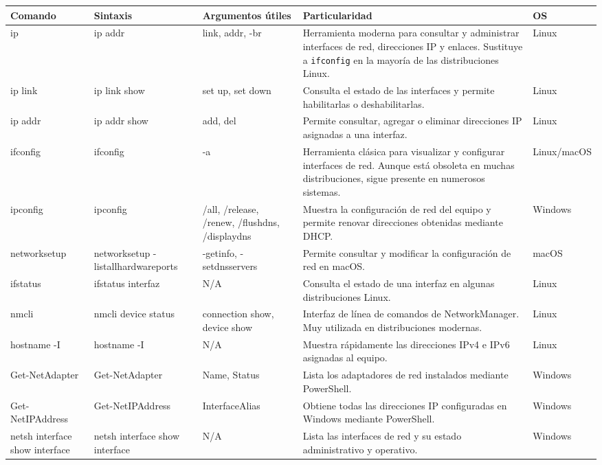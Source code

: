 \documentclass[a4paper,10pt]{article}
\begin{document}
\begin{longtable}{|p{2.8cm}|p{3cm}|p{4cm}|p{5.6cm}|p{1.5cm}|}

\hline
Comando &
Sintaxis &
Argumentos útiles &
Particularidad &
OS
\\
\hline
\endhead

ip &
ip addr &
link, addr, -br &
Herramienta moderna para consultar y administrar interfaces de red, direcciones IP y enlaces. Sustituye a \texttt{ifconfig} en la mayoría de las distribuciones Linux. &
Linux
\\
\hline

ip link &
ip link show &
set up, set down &
Consulta el estado de las interfaces y permite habilitarlas o deshabilitarlas. &
Linux
\\
\hline

ip addr &
ip addr show &
add, del &
Permite consultar, agregar o eliminar direcciones IP asignadas a una interfaz. &
Linux
\\
\hline

ifconfig &
ifconfig &
-a &
Herramienta clásica para visualizar y configurar interfaces de red. Aunque está obsoleta en muchas distribuciones, sigue presente en numerosos sistemas. &
Linux/macOS
\\
\hline

ipconfig &
ipconfig &
/all, /release, /renew, /flushdns, /displaydns &
Muestra la configuración de red del equipo y permite renovar direcciones obtenidas mediante DHCP. &
Windows
\\
\hline

networksetup &
networksetup -listallhardwareports &
-getinfo, -setdnsservers &
Permite consultar y modificar la configuración de red en macOS. &
macOS
\\
\hline

ifstatus &
ifstatus interfaz &
N/A &
Consulta el estado de una interfaz en algunas distribuciones Linux. &
Linux
\\
\hline

nmcli &
nmcli device status &
connection show, device show &
Interfaz de línea de comandos de NetworkManager. Muy utilizada en distribuciones modernas. &
Linux
\\
\hline

hostname -I &
hostname -I &
N/A &
Muestra rápidamente las direcciones IPv4 e IPv6 asignadas al equipo. &
Linux
\\
\hline

Get-NetAdapter &
Get-NetAdapter &
Name, Status &
Lista los adaptadores de red instalados mediante PowerShell. &
Windows
\\
\hline

Get-NetIPAddress &
Get-NetIPAddress &
InterfaceAlias &
Obtiene todas las direcciones IP configuradas en Windows mediante PowerShell. &
Windows
\\
\hline

netsh interface show interface &
netsh interface show interface &
N/A &
Lista las interfaces de red y su estado administrativo y operativo. &
Windows
\\
\hline

\end{longtable}
\end{document}
